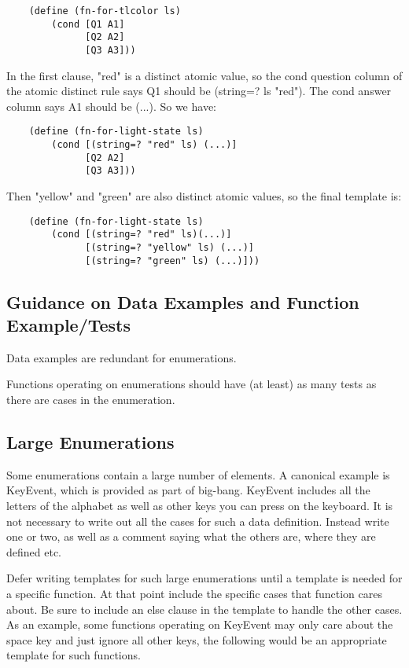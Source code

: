 \documentclass[11pt,a4paper]{report}
\begin{document}
	\begin{verbatim}
	(define (fn-for-tlcolor ls)
		(cond [Q1 A1]
		      [Q2 A2]
		      [Q3 A3]))
	\end{verbatim}
	
	In the first clause, "red" is a distinct atomic value, so the cond question column of the atomic
	distinct rule says Q1 should be (string=? ls "red"). The cond answer column says A1 should
	be (...). So we have:
	
	\begin{verbatim}
	(define (fn-for-light-state ls)
		(cond [(string=? "red" ls) (...)]
		      [Q2 A2]
		      [Q3 A3]))
	\end{verbatim}
	
	Then "yellow" and "green" are also distinct atomic values, so the final template is:
	
	\begin{verbatim}
	(define (fn-for-light-state ls)
		(cond [(string=? "red" ls)(...)]
		      [(string=? "yellow" ls) (...)]
		      [(string=? "green" ls) (...)]))
	\end{verbatim}
	
	\subsection*{Guidance on Data Examples and Function Example/Tests}
	Data examples are redundant for enumerations.
	
	Functions operating on enumerations should have (at least) as many tests as there are cases in
	the enumeration.
	
	\subsection*{Large Enumerations}
	Some enumerations contain a large number of elements. A canonical example is KeyEvent, which
	is provided as part of big-bang. KeyEvent includes all the letters of the alphabet as well as other
	keys you can press on the keyboard. It is not necessary to write out all the cases for such a data
	definition. Instead write one or two, as well as a comment saying what the others are, where they
	are defined etc.
	
	Defer writing templates for such large enumerations until a template is needed for a specific
	function. At that point include the specific cases that function cares about. Be sure to include an
	else clause in the template to handle the other cases. As an example, some functions operating
	on KeyEvent may only care about the space key and just ignore all other keys, the following
	would be an appropriate template for such functions.
	
\end{document}

